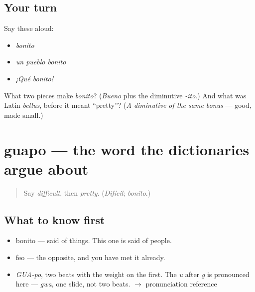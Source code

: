 \subsection*{Your turn}
Say these aloud:

\begin{itemize}
\raggedright
  \item \emph{bonito}
  \item \emph{un pueblo bonito}
  \item \emph{¡Qué bonito!}
\end{itemize}

\begin{tcolorbox}[breakable,colback=teal!4,colframe=teal!35!black,title={Before you move on}]
What two pieces make \emph{bonito}? (\emph{Bueno} plus the diminutive \emph{-ito}.) And what was Latin \emph{bellus}, before it meant \textquotedblleft{}pretty\textquotedblright{}? (\emph{A diminutive of the same bonus} — good, made small.)
\end{tcolorbox}
\section[guapo]{guapo — the word the dictionaries argue about}

\label{lesson:ES-C399-guapo}



\begin{quote}
Say \emph{difficult}, then \emph{pretty}. (\emph{Difícil}; \emph{bonito}.)
\end{quote}

\subsection*{What to know first}
\begin{itemize}
\raggedright
  \item bonito — said of things. This one is said of people.
  \item feo — the opposite, and you have met it already.
\end{itemize}

\begin{sounds}
\begin{itemize}
\raggedright
  \item \emph{GUA-po}, two beats with the weight on the first. The \emph{u} after \emph{g} is pronounced here — \emph{gwa}, one slide, not two beats. $\to$ pronunciation reference
\end{itemize}
\end{sounds}

